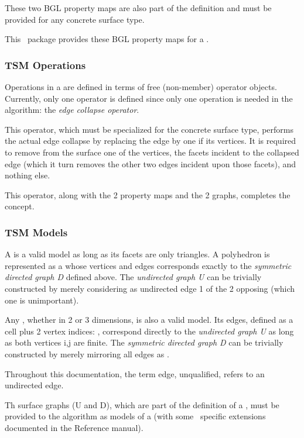 These two BGL property maps are also part of the  definition and must be provided for any concrete surface type.

This \cgal\ package provides these BGL property maps for a .

\subsubsection{TSM Operations}

Operations in a  are defined in terms of free (non-member) operator objects. Currently, only one operator is defined since only one operation is needed in the algorithm: the {\em edge collapse operator}.
 
This operator, which must be specialized for the concrete surface type, performs the actual edge collapse by replacing the edge by one if its vertices. It is required to remove from the surface one of the vertices, the facets incident to the collapsed edge (which it turn removes the other two edges incident upon those facets), and nothing else.

This operator, along with the 2 property maps and the 2 graphs, completes the  concept.

\subsubsection{TSM Models}

A  is a valid  model as long as its facets are only triangles. A polyhedron is represented as a  whose vertices and edges corresponds exactly to the {\em symmetric directed graph D} defined above. The {\em undirected graph U} can be trivially constructed by merely considering as undirected edge 1 of the 2 opposing  (which one is unimportant).

Any , whether in 2 or 3 dimensions, is also a valid  model. Its edges, defined as a cell plus 2 vertex indices: , correspond directly to the {\em undirected graph U} as long as both vertices i,j are finite. The {\em symmetric directed graph D} can be trivially constructed by merely mirroring all edges  as . 

Throughout this documentation, the term edge, unqualified, refers to an undirected edge.

Th surface graphs (U and D), which are part of the definition of a , must be provided to the algorithm as models of a  (with some \cgal\ specific extensions documented in the Reference manual).

